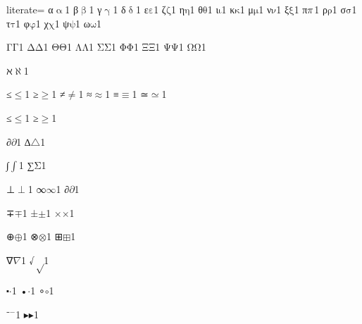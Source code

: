 {%
literate=
{α}{{\ensuremath{\mathrm{\upalpha}}}}1
{β}{{\ensuremath{\mathrm{\upbeta}}}}1
{γ}{{\ensuremath{\mathrm{\upgamma}}}}1
{δ}{{\ensuremath{\mathrm{\updelta}}}}1
{ε}{{\ensuremath{\mathrm{\varepsilon}}}}1
{ζ}{{\ensuremath{\mathrm{\zeta}}}}1
{η}{{\ensuremath{\mathrm{\eta}}}}1
{θ}{{\ensuremath{\mathrm{\theta}}}}1
{ι}{{\ensuremath{\mathrm{\iota}}}}1
{κ}{{\ensuremath{\mathrm{\kappa}}}}1
{μ}{{\ensuremath{\mathrm{\mu}}}}1
{ν}{{\ensuremath{\mathrm{\nu}}}}1
{ξ}{{\ensuremath{\mathrm{\xi}}}}1
{π}{{\ensuremath{\mathrm{\mathnormal{\pi}}}}}1
{ρ}{{\ensuremath{\mathrm{\rho}}}}1
{σ}{{\ensuremath{\mathrm{\sigma}}}}1
{τ}{{\ensuremath{\mathrm{\tau}}}}1
{φ}{{\ensuremath{\mathrm{\varphi}}}}1
{χ}{{\ensuremath{\mathrm{\chi}}}}1
{ψ}{{\ensuremath{\mathrm{\psi}}}}1
{ω}{{\ensuremath{\mathrm{\omega}}}}1

{Γ}{{\ensuremath{\mathrm{\Gamma}}}}1
{Δ}{{\ensuremath{\mathrm{\Delta}}}}1
{Θ}{{\ensuremath{\mathrm{\Theta}}}}1
{Λ}{{\ensuremath{\mathrm{\Lambda}}}}1
{Σ}{{\ensuremath{\mathrm{\Sigma}}}}1
{Φ}{{\ensuremath{\mathrm{\Phi}}}}1
{Ξ}{{\ensuremath{\mathrm{\Xi}}}}1
{Ψ}{{\ensuremath{\mathrm{\Psi}}}}1
{Ω}{{\ensuremath{\mathrm{\Omega}}}}1

{ℵ}{{\ensuremath{\aleph}}}1

{≤}{{\ensuremath{\leq}}}1
{≥}{{\ensuremath{\geq}}}1
{≠}{{\ensuremath{\neq}}}1
{≈}{{\ensuremath{\approx}}}1
{≡}{{\ensuremath{\equiv}}}1
{≃}{{\ensuremath{\simeq}}}1

{≤}{{\ensuremath{\leq}}}1
{≥}{{\ensuremath{\geq}}}1

{∂}{{\ensuremath{\partial}}}1
{∆}{{\ensuremath{\triangle}}}1 %

{∫}{{\ensuremath{\int}}}1
{∑}{{\ensuremath{\mathrm{\Sigma}}}}1

{⊥}{{\ensuremath{\perp}}}1
{∞}{{\ensuremath{\infty}}}1
{∂}{{\ensuremath{\partial}}}1

{∓}{{\ensuremath{\mp}}}1
{±}{{\ensuremath{\pm}}}1
{×}{{\ensuremath{\times}}}1

{⊕}{{\ensuremath{\oplus}}}1
{⊗}{{\ensuremath{\otimes}}}1
{⊞}{{\ensuremath{\boxplus}}}1

{∇}{{\ensuremath{\nabla}}}1
{√}{{\ensuremath{\sqrt}}}1

{⬝}{{\ensuremath{\cdot}}}1
{•}{{\ensuremath{\cdot}}}1
{∘}{{\ensuremath{\circ}}}1

{⁻}{{\ensuremath{^{-}}}}1
{▸}{{\ensuremath{\blacktriangleright}}}1

}
